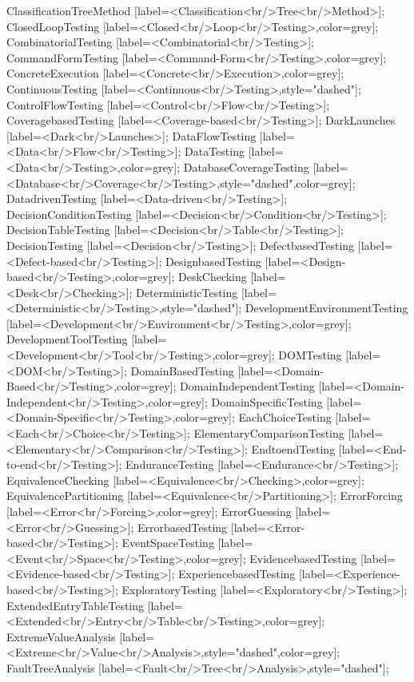 \documentclass{article}
\begin{document}
{ClassificationTreeMethod [label=<Classification<br/>Tree<br/>Method>];
ClosedLoopTesting [label=<Closed<br/>Loop<br/>Testing>,color=grey];
CombinatorialTesting [label=<Combinatorial<br/>Testing>];
CommandFormTesting [label=<Command-Form<br/>Testing>,color=grey];
ConcreteExecution [label=<Concrete<br/>Execution>,color=grey];
ContinuousTesting [label=<Continuous<br/>Testing>,style="dashed"];
ControlFlowTesting [label=<Control<br/>Flow<br/>Testing>];
CoveragebasedTesting [label=<Coverage-based<br/>Testing>];
DarkLaunches [label=<Dark<br/>Launches>];
DataFlowTesting [label=<Data<br/>Flow<br/>Testing>];
DataTesting [label=<Data<br/>Testing>,color=grey];
DatabaseCoverageTesting [label=<Database<br/>Coverage<br/>Testing>,style="dashed",color=grey];
DatadrivenTesting [label=<Data-driven<br/>Testing>];
DecisionConditionTesting [label=<Decision<br/>Condition<br/>Testing>];
DecisionTableTesting [label=<Decision<br/>Table<br/>Testing>];
DecisionTesting [label=<Decision<br/>Testing>];
DefectbasedTesting [label=<Defect-based<br/>Testing>];
DesignbasedTesting [label=<Design-based<br/>Testing>,color=grey];
DeskChecking [label=<Desk<br/>Checking>];
DeterministicTesting [label=<Deterministic<br/>Testing>,style="dashed"];
DevelopmentEnvironmentTesting [label=<Development<br/>Environment<br/>Testing>,color=grey];
DevelopmentToolTesting [label=<Development<br/>Tool<br/>Testing>,color=grey];
DOMTesting [label=<DOM<br/>Testing>];
DomainBasedTesting [label=<Domain-Based<br/>Testing>,color=grey];
DomainIndependentTesting [label=<Domain-Independent<br/>Testing>,color=grey];
DomainSpecificTesting [label=<Domain-Specific<br/>Testing>,color=grey];
EachChoiceTesting [label=<Each<br/>Choice<br/>Testing>];
ElementaryComparisonTesting [label=<Elementary<br/>Comparison<br/>Testing>];
EndtoendTesting [label=<End-to-end<br/>Testing>];
EnduranceTesting [label=<Endurance<br/>Testing>];
EquivalenceChecking [label=<Equivalence<br/>Checking>,color=grey];
EquivalencePartitioning [label=<Equivalence<br/>Partitioning>];
ErrorForcing [label=<Error<br/>Forcing>,color=grey];
ErrorGuessing [label=<Error<br/>Guessing>];
ErrorbasedTesting [label=<Error-based<br/>Testing>];
EventSpaceTesting [label=<Event<br/>Space<br/>Testing>,color=grey];
EvidencebasedTesting [label=<Evidence-based<br/>Testing>];
ExperiencebasedTesting [label=<Experience-based<br/>Testing>];
ExploratoryTesting [label=<Exploratory<br/>Testing>];
ExtendedEntryTableTesting [label=<Extended<br/>Entry<br/>Table<br/>Testing>,color=grey];
ExtremeValueAnalysis [label=<Extreme<br/>Value<br/>Analysis>,style="dashed",color=grey];
FaultTreeAnalysis [label=<Fault<br/>Tree<br/>Analysis>,style="dashed"];
}
\end{document}
